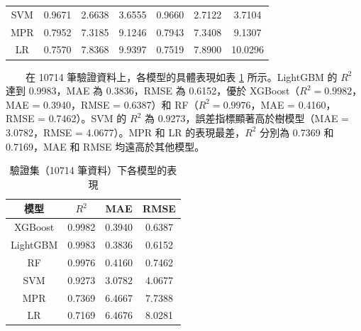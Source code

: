 \documentclass[12pt,a4paper]{article}
\begin{document}
\begin{enumerate}
\begin{enumerate}[label=\arabic*.]
\begin{enumerate}[label=3-2-\arabic*.]
\begin{enumerate}[label=\Alph*.]
\begin{table}[H]
\begin{tabular}{|c|c|c|c|c|c|c|}
                                SVM & 0.9671 & 2.6638 & 3.6555 & 0.9660 & 2.7122 & 3.7104 \\
                                MPR & 0.7952 & 7.3185 & 9.1246 & 0.7943 & 7.3408 & 9.1307 \\
                                LR & 0.7570 & 7.8368 & 9.9397 & 0.7519 & 7.8900 & 10.0296 \\
                                \hline
                            \end{tabular}
                        \end{table}
                        　　在 10714 筆驗證資料上，各模型的具體表現如表 \ref{table:validation_data} 所示。LightGBM 的 \( R^2 \) 達到 0.9983，MAE 為 0.3836，RMSE 為 0.6152，優於 XGBoost（\( R^2 = 0.9982 \)，MAE = 0.3940，RMSE = 0.6387）和 RF（\( R^2 = 0.9976 \)，MAE = 0.4160，RMSE = 0.7462）。SVM 的 \( R^2 \) 為 0.9273，誤差指標顯著高於樹模型（MAE = 3.0782，RMSE = 4.0677）。MPR 和 LR 的表現最差，\( R^2 \) 分別為 0.7369 和 0.7169，MAE 和 RMSE 均遠高於其他模型。
                        \begin{table}[H]
                            \centering
                            \caption{驗證集（10714 筆資料）下各模型的表現}
                            \label{table:validation_data}
                            \begin{tabular}{|c|c|c|c|}
                                \hline
                                模型 & \( R^2 \) & MAE & RMSE \\
                                \hline
                                XGBoost & 0.9982 & 0.3940 & 0.6387 \\
                                LightGBM & 0.9983 & 0.3836 & 0.6152 \\
                                RF & 0.9976 & 0.4160 & 0.7462 \\
                                SVM & 0.9273 & 3.0782 & 4.0677 \\
                                MPR & 0.7369 & 6.4667 & 7.7388 \\
                                LR & 0.7169 & 6.4676 & 8.0281 \\
                                \hline
                            \end{tabular}
                        \end{table}

\end{enumerate}
\end{enumerate}
\end{enumerate}
\end{enumerate}
\end{document}
